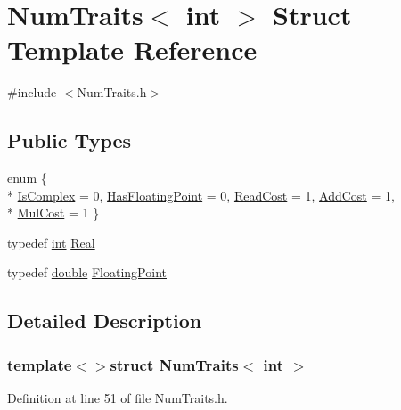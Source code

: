\hypertarget{struct_num_traits_3_01int_01_4}{\section{Num\-Traits$<$ int $>$ Struct Template Reference}
\label{struct_num_traits_3_01int_01_4}
}


{\ttfamily \#include $<$Num\-Traits.\-h$>$}

\subsection*{Public Types}
\begin{DoxyCompactItemize}
\item 
enum \{ \\*
\hyperlink{struct_num_traits_3_01int_01_4_a490134af987bbd4f8c988735e040a1a0af49d2b627993e8f669d5dae09d06b518}{Is\-Complex} = 0, 
\hyperlink{struct_num_traits_3_01int_01_4_a490134af987bbd4f8c988735e040a1a0a2bc54bc1c1ad5374772b3817cbc166ac}{Has\-Floating\-Point} = 0, 
\hyperlink{struct_num_traits_3_01int_01_4_a490134af987bbd4f8c988735e040a1a0a6aaa95713b764f67b06105786138363f}{Read\-Cost} = 1, 
\hyperlink{struct_num_traits_3_01int_01_4_a490134af987bbd4f8c988735e040a1a0a839886d46c4889ff7aca7500924c2f0e}{Add\-Cost} = 1, 
\\*
\hyperlink{struct_num_traits_3_01int_01_4_a490134af987bbd4f8c988735e040a1a0a7cc9d116b4bcfbba7dc1d610b8a02079}{Mul\-Cost} = 1
 \}
\item 
typedef \hyperlink{ioapi_8h_a787fa3cf048117ba7123753c1e74fcd6}{int} \hyperlink{struct_num_traits_3_01int_01_4_af384e7a7ef8f1bd98e94de1cbcfc9b51}{Real}
\item 
typedef \hyperlink{_super_l_u_support_8h_a8956b2b9f49bf918deed98379d159ca7}{double} \hyperlink{struct_num_traits_3_01int_01_4_abcf7772310a2687a5faf8c3cf36896d2}{Floating\-Point}
\end{DoxyCompactItemize}


\subsection{Detailed Description}
\subsubsection*{template$<$$>$struct Num\-Traits$<$ int $>$}



Definition at line 51 of file Num\-Traits.\-h.



